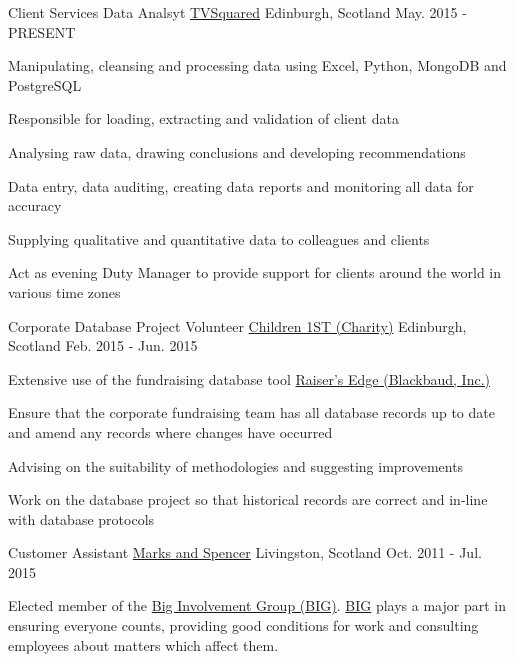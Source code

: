 \begin{cventries}
  \cventry
    {Client Services Data Analsyt}
    {\href{http://tvsquared.com/}{TVSquared}}
    {Edinburgh, Scotland}
    {May. 2015 - PRESENT}
    {
      \begin{cvitems}
        \item {Manipulating, cleansing and processing data using Excel, Python, MongoDB and PostgreSQL}
        \item {Responsible for loading, extracting and validation of client data}
        \item {Analysing raw data, drawing conclusions and developing recommendations}
        \item {Data entry, data auditing, creating data reports and monitoring all data for accuracy}
        \item {Supplying qualitative and quantitative data to colleagues and clients}
        \item {Act as evening Duty Manager to provide support for clients around the world in various time zones}
      \end{cvitems}
    }
  \cventry
    {Corporate Database Project Volunteer}
    {\href{http://www.children1st.org.uk/}{Children 1ST (Charity)}}
    {Edinburgh, Scotland}
    {Feb. 2015 - Jun. 2015}
    {
      \begin{cvitems}
        \item {Extensive use of the fundraising database tool \href{https://www.blackbaud.com/fundraising-and-relationship-management/raisers-edge}{Raiser's Edge (Blackbaud, Inc.)}}
        \item {Ensure that the corporate fundraising team has all database records up to date and amend any records where changes have occurred}
        \item {Advising on the suitability of methodologies and suggesting improvements}
        \item {Work on the database project so that historical records are correct and in-line with database protocols}
      \end{cvitems} 
    }
  \cventry
    {Customer Assistant}
    {\href{http://www.marksandspencer.com/}{Marks and Spencer}}
    {Livingston, Scotland}
    {Oct. 2011 - Jul. 2015}
    {
      \begin{cvitems}
        \item {Elected member of the \href{https://corporate.marksandspencer.com/documents/policy-documents/people-principles-.pdf}{Big Involvement Group (BIG)}. \href{https://corporate.marksandspencer.com/documents/policy-documents/people-principles-.pdf}{BIG} plays a major part in ensuring everyone counts, providing good conditions for work and consulting employees about matters which affect them.}

\end{cvitems}}
\end{cventries}
